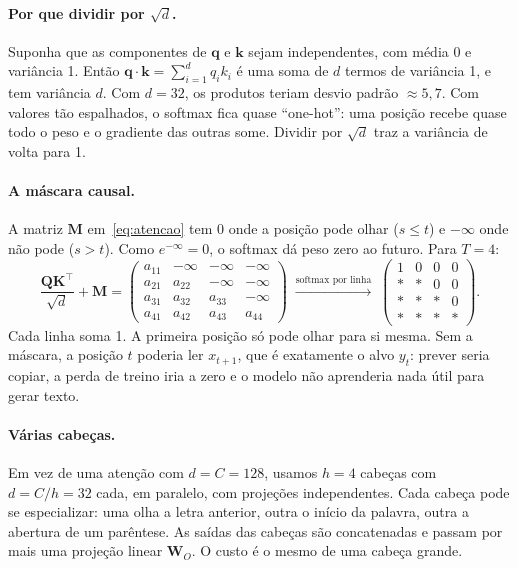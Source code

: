 \documentclass[11pt,a4paper]{article}
\newcommand{\softmax}{\operatorname{softmax}}
\begin{document}
\paragraph{Por que dividir por $\sqrt d$.} Suponha que as componentes de $\bm q$ e $\bm k$ sejam independentes, com média 0 e variância 1. Então $\bm q\cdot\bm k = \sum_{i=1}^{d} q_i k_i$ é uma soma de $d$ termos de variância 1, e tem variância $d$. Com $d=32$, os produtos teriam desvio padrão $\approx 5{,}7$. Com valores tão espalhados, o softmax fica quase ``one-hot'': uma posição recebe quase todo o peso e o gradiente das outras some. Dividir por $\sqrt d$ traz a variância de volta para 1.

\paragraph{A máscara causal.}
\label{sec:mascara}
A matriz $\bm M$ em~\eqref{eq:atencao} tem 0 onde a posição pode olhar ($s \le t$) e $-\infty$ onde não pode ($s > t$). Como $e^{-\infty} = 0$, o softmax dá peso zero ao futuro. Para $T=4$:
\[
\frac{\bm Q\bm K^\top}{\sqrt d} + \bm M =
\begin{pmatrix}
a_{11} & -\infty & -\infty & -\infty\\
a_{21} & a_{22} & -\infty & -\infty\\
a_{31} & a_{32} & a_{33} & -\infty\\
a_{41} & a_{42} & a_{43} & a_{44}
\end{pmatrix}
\;\xrightarrow{\softmax\text{ por linha}}\;
\begin{pmatrix}
1 & 0 & 0 & 0\\
\ast & \ast & 0 & 0\\
\ast & \ast & \ast & 0\\
\ast & \ast & \ast & \ast
\end{pmatrix}.
\]
Cada linha soma 1. A primeira posição só pode olhar para si mesma. Sem a máscara, a posição $t$ poderia ler $x_{t+1}$, que é exatamente o alvo $y_t$: prever seria copiar, a perda de treino iria a zero e o modelo não aprenderia nada útil para gerar texto.

\paragraph{Várias cabeças.} Em vez de uma atenção com $d = C = 128$, usamos $h=4$ cabeças com $d = C/h = 32$ cada, em paralelo, com projeções independentes. Cada cabeça pode se especializar: uma olha a letra anterior, outra o início da palavra, outra a abertura de um parêntese. As saídas das cabeças são concatenadas e passam por mais uma projeção linear $\bm W_O$. O custo é o mesmo de uma cabeça grande.
\end{document}
